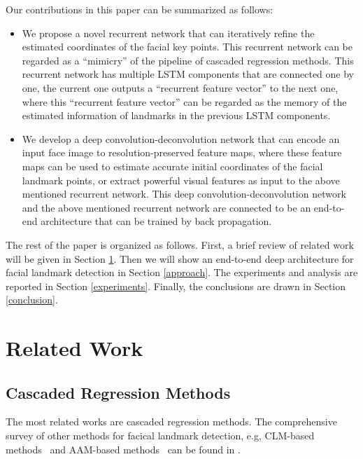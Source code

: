 \documentclass[journal]{IEEEtran}
\begin{document}
Our contributions in this paper can be summarized as follows:
\begin{itemize}
\item We propose a novel recurrent network that can iteratively refine the estimated coordinates of the facial key points. This recurrent network can be regarded as a ``mimicry'' of the pipeline of cascaded regression methods. This recurrent network has multiple LSTM components that are connected one by one, the current one outputs a ``recurrent feature vector'' to the next one, where this ``recurrent feature vector'' can be regarded as the memory of the estimated information of landmarks in the previous LSTM components.

\item We develop a deep convolution-deconvolution network that can encode an input face image to resolution-preserved feature maps, where these feature maps can be used to estimate accurate initial coordinates of the facial landmark points, or extract powerful visual features as input to the above mentioned recurrent network. This deep convolution-deconvolution network and the above mentioned recurrent network are connected to be an end-to-end architecture that can be trained by back propagation.

\end{itemize}


The rest of the paper is organized as follows. First, a brief review of related work will be given in Section \ref{related_work}. Then we will show an end-to-end deep architecture for facial landmark detection in Section \ref{approach}. The experiments and analysis are reported in Section \ref{experiments}. Finally, the conclusions are drawn in Section \ref{conclusion}.

\section{Related Work}
\label{related_work}
%

\subsection{Cascaded Regression Methods}
The most related works are cascaded regression methods. The comprehensive survey of other methods for facical landmark detection, e.g, CLM-based methods~\cite{martinez2013local} and AAM-based methods~\cite{gao2010review} can be found in \cite{wangsurvey}.
\end{document}
